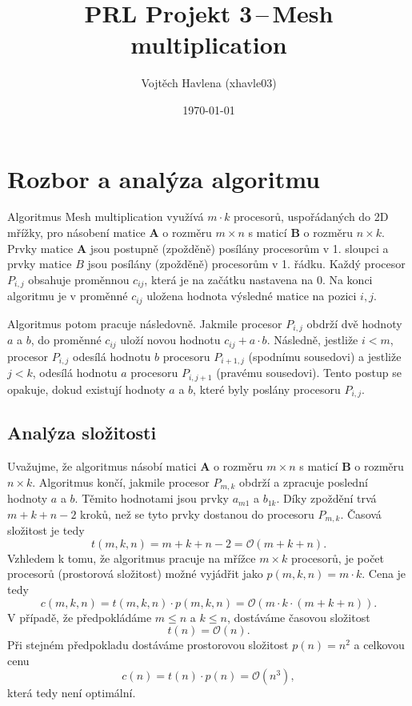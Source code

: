 \documentclass[a4paper,12pt]{article}
\title{\bf PRL Projekt 3\,--\,Mesh multiplication}
\author{Vojtěch Havlena (xhavle03)}
\date{\today}
\begin{document}
\maketitle


\section{Rozbor a analýza algoritmu}
Algoritmus Mesh multiplication využívá $m\cdot k$ procesorů, uspořádaných do 2D mřížky, pro násobení matice $\mathbf{A}$ o rozměru 
$m\times n$ s maticí $\mathbf{B}$ o rozměru $n\times k$. Prvky matice $\mathbf{A}$ jsou postupně (zpožděně) posílány procesorům v 1. sloupci a  
prvky matice $B$ jsou posílány (zpožděně) procesorům v 1. řádku. Každý procesor $P_{i,j}$ obsahuje proměnnou $c_{ij}$, která
je na začátku nastavena na $0$. Na konci algoritmu je v proměnné $c_{ij}$ uložena hodnota výsledné matice na pozici $i,j$.

Algoritmus potom pracuje následovně. Jakmile procesor $P_{i,j}$ obdrží dvě hodnoty $a$ a $b$, do proměnné $c_{ij}$ uloží 
novou hodnotu $c_{ij} + a\cdot b$. Následně, jestliže $i < m$, procesor $P_{i,j}$ odesílá hodnotu $b$ procesoru 
$P_{i+1,j}$ (spodnímu sousedovi) a jestliže $j < k$, odesílá hodnotu $a$ procesoru $P_{i,j+1}$ (pravému sousedovi).
Tento postup se opakuje, dokud existují hodnoty $a$ a $b$, které byly poslány procesoru $P_{i,j}$.

\subsection*{Analýza složitosti}
Uvažujme, že algoritmus násobí matici $\mathbf{A}$ o rozměru $m\times n$ s maticí $\mathbf{B}$ o rozměru $n\times k$.
Algoritmus končí, jakmile procesor $P_{m,k}$ obdrží a zpracuje poslední hodnoty $a$ a $b$. Těmito hodnotami
jsou prvky $a_{m1}$ a $b_{1k}$. Díky zpoždění trvá $m+k+n-2$ kroků, než se tyto prvky dostanou do 
procesoru $P_{m,k}$. Časová složitost je tedy 
\begin{equation}
  t(m,k,n) = m+k+n-2 = \mathcal{O}(m+k+n).
\end{equation}
Vzhledem k tomu, že algoritmus pracuje na mřížce $m\times k$ procesorů, je počet procesorů (prostorová složitost)
možné vyjádřit jako $p(m,k,n) = m\cdot k$. Cena je tedy
\begin{equation}
  c(m,k,n) = t(m,k,n) \cdot p(m,k,n) =\mathcal{O}(m\cdot k\cdot (m+k+n)).
\end{equation}
V případě, že předpokládáme $m \leq n$ a $k\leq n$, dostáváme časovou složitost
\begin{equation}
  t(n) = \mathcal{O}(n).
\end{equation}
Při stejném předpokladu dostáváme prostorovou složitost $p(n) = n^2$ a 
celkovou cenu
\begin{equation}
  c(n) = t(n) \cdot p(n) = \mathcal{O}(n^3),
\end{equation}
která tedy není optimální.
\end{document}
